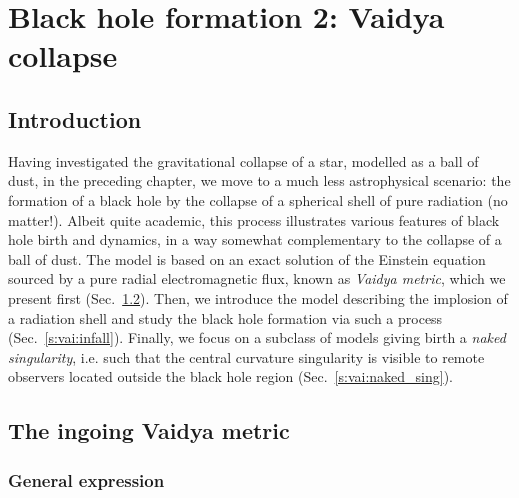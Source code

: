 \chapter{Black hole formation 2: Vaidya collapse}
\label{s:vai}

\minitoc

\section{Introduction}

Having investigated the gravitational collapse of a star, modelled as a ball of dust,
in the preceding chapter, we move to a much less astrophysical scenario: the
formation of a black hole by the collapse of a spherical shell of pure radiation
(no matter!).
Albeit quite academic, this process illustrates various features of black hole birth and dynamics,
in a way somewhat complementary to the collapse of a ball of dust.
The model is based on an exact solution of the Einstein equation sourced by
a pure radial electromagnetic flux, known as \emph{Vaidya metric}, which
we present first (Sec.~\ref{s:vai:Vaidya_metric}).
Then, we introduce the
model describing the implosion of a radiation shell and
study the black hole formation via such a process (Sec.~\ref{s:vai:infall}).
Finally, we focus on a subclass of models giving birth a \emph{naked singularity}, i.e.
such that the central curvature singularity is visible to remote observers located
outside the black hole region (Sec.~\ref{s:vai:naked_sing}).


\section{The ingoing Vaidya metric} \label{s:vai:Vaidya_metric}

\subsection{General expression} \label{s:vai:general}

